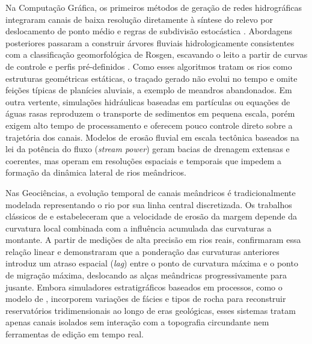 \documentclass[9pt,a4paper,twocolumn]{extarticle}
\begin{document}
Na Computação Gráfica, os primeiros métodos de geração de redes hidrográficas integraram canais de baixa resolução diretamente à síntese do relevo por deslocamento de ponto médio \parencite{kelley1988terrain} e regras de subdivisão estocástica \parencite{prusinkiewicz1993fractal}. Abordagens posteriores passaram a construir árvores fluviais hidrologicamente consistentes com a classificação geomorfológica de Rosgen, escavando o leito a partir de curvas de controle e perfis pré-definidos \parencite{genevaux2013terrain, peytavie2019procedural}. Como esses algoritmos tratam os rios como estruturas geométricas estáticas, o traçado gerado não evolui no tempo e omite feições típicas de planícies aluviais, a exemplo de meandros abandonados. Em outra vertente, simulações hidráulicas baseadas em partículas \parencite{kristof2009hydraulic} ou equações de águas rasas \parencite{benes2006hydraulic} reproduzem o transporte de sedimentos em pequena escala, porém exigem alto tempo de processamento e oferecem pouco controle direto sobre a trajetória dos canais. Modelos de erosão fluvial em escala tectônica baseados na lei da potência do fluxo (\textit{stream power}) \parencite{cordonnier2016large, schott2023large} geram bacias de drenagem extensas e coerentes, mas operam em resoluções espaciais e temporais que impedem a formação da dinâmica lateral de rios meândricos.

Nas Geociências, a evolução temporal de canais meândricos é tradicionalmente modelada representando o rio por sua linha central discretizada. Os trabalhos clássicos de \textcite{ikeda1981bend} e \textcite{howard1984sufficient} estabeleceram que a velocidade de erosão da margem depende da curvatura local combinada com a influência acumulada das curvaturas a montante. A partir de medições de alta precisão em rios reais, \textcite{sylvester2019high} confirmaram essa relação linear e demonstraram que a ponderação das curvaturas anteriores introduz um atraso espacial (\textit{lag}) entre o ponto de curvatura máxima e o ponto de migração máxima, deslocando as alças meândricas progressivamente para jusante. Embora simuladores estratigráficos baseados em processos, como o modelo de \textcite{lopez2009process}, incorporem variações de fácies e tipos de rocha para reconstruir reservatórios tridimensionais ao longo de eras geológicas, esses sistemas tratam apenas canais isolados sem interação com a topografia circundante nem ferramentas de edição em tempo real.
\end{document}
